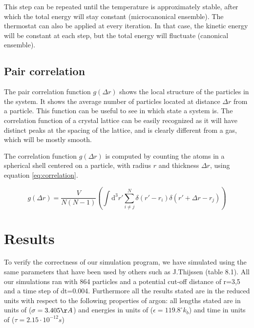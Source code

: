 \documentclass[12pt,a4paper]{report}
\begin{document}
This step can be repeated until the temperature is approximately stable, after which the total energy will stay constant (microcanonical ensemble). The thermostat can also be applied at every iteration. In that case, the kinetic energy will be constant at each step, but the total energy will fluctuate (canonical ensemble).

\section{Pair correlation}

The pair correlation function $g(\Delta r)$ shows the local structure of the particles in the system. It shows the average number of particles located at distance $\Delta r$ from a particle. This function can be useful to see in which state a system is. The correlation function of a crystal lattice can be easily recognized as it will have distinct peaks at the spacing of the lattice, and is clearly different from a gas, which will be mostly smooth.

The correlation function $g(\Delta r)$ is computed by counting the atoms in a spherical shell centered on a particle, with radius $r$ and thickness $\Delta r$, using equation \ref{eq:correlation}.

\begin{equation}\label{eq:correlation}
	g(\Delta r) = \frac{V}{N(N-1)} \left( \int \text{d}^3 r' \sum_{i \neq j}^{N} \delta(r'-r_i) \delta(r' + \Delta r - r_j) \right)
\end{equation}

\chapter{Results}

To verify the correctness of our simulation program, we have simulated using the same parameters that have been used by others such as J.Thijssen \cite{thijssen} (table 8.1). All our simulations ran with 864 particles and a potential cut-off distance of r=3,5 and a time step of dt=0.004. Furthermore all the results stated are in the reduced units with respect to the following properties of argon: all lengths stated are in units of ($\sigma =3.405\AA$) and energies in units of ($\epsilon =119.8^{\circ}k_b$) and time in units of ($\tau =2.15\cdot 10^{-12}s$)
\end{document}
